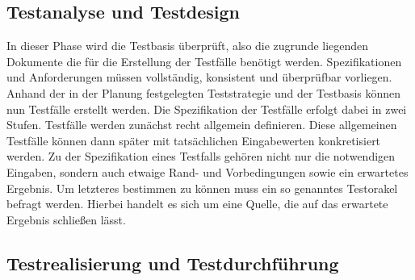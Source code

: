 \subsection{Testanalyse und Testdesign}
\label{subsec:testanalyse_und_design}
In dieser Phase wird die Testbasis überprüft, also die zugrunde liegenden Dokumente die für die Erstellung der Testfälle benötigt werden. Spezifikationen und Anforderungen müssen vollständig, konsistent und überprüfbar vorliegen.
Anhand der in der Planung festgelegten Teststrategie und der Testbasis können nun Testfälle erstellt werden.
Die Spezifikation der Testfälle erfolgt dabei in zwei Stufen. Testfälle werden zunächst recht allgemein definieren. Diese allgemeinen Testfälle können dann später mit tatsächlichen Eingabewerten konkretisiert werden.
Zu der Spezifikation eines Testfalls gehören nicht nur die notwendigen Eingaben, sondern auch etwaige Rand- und Vorbedingungen sowie ein erwartetes Ergebnis. Um letzteres bestimmen zu können muss ein so genanntes Testorakel befragt werden. Hierbei handelt es sich um eine Quelle, die auf das erwartete Ergebnis schließen lässt.

\subsection{Testrealisierung und Testdurchführung}
\label{subsec:testrealisierung_und_durchführung}